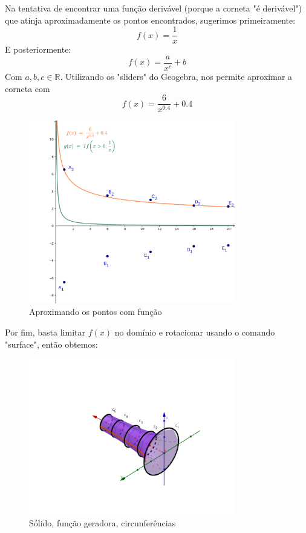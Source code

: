 \documentclass[english,ngerman,parskip=half]{scrartcl}
\begin{document}
\begin{enumerate}
        Na tentativa de encontrar uma função derivável (porque a corneta "é derivável")
        que atinja aproximadamente os pontos encontrados, sugerimos primeiramente:
        $$ f(x) = \dfrac{1}{x}$$
        E posteriormente:
        $$ f(x) = \dfrac{a}{x^c} + b$$
        Com $a,b,c \in \mathbb{R}$.
        Utilizando os "sliders" do Geogebra, nos permite aproximar a corneta com 
        $$ f(x) = \dfrac{6}{x^{0.4}} + 0.4$$
        
        \begin{figure}[ht!]
            \centering
            \includegraphics[width=90mm]{./images/2d-x-na-menos-um-e-aproximacao.png}
            \caption{Aproximando os pontos com função \label{2d-x-na-menos-um-e-aproximacao}}
        \end{figure}
        

        Por fim, basta limitar $f(x)$ no domínio e rotacionar usando o comando "surface", então obtemos:
        
        \begin{figure}[ht!]
            \centering
            \includegraphics[width=90mm]{./images/3d-solido-pronto-e-funcao-geradora.png}
            \caption{Sólido, função geradora, circunferências \label{3d-solido-funcao-circunferencias}}
        \end{figure}


\end{enumerate}
\end{document}
